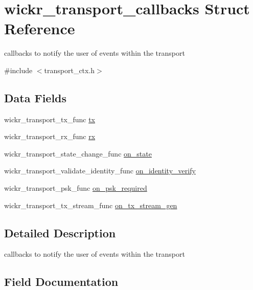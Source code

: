 \hypertarget{structwickr__transport__callbacks}{}\section{wickr\+\_\+transport\+\_\+callbacks Struct Reference}
\label{structwickr__transport__callbacks}


callbacks to notify the user of events within the transport  




{\ttfamily \#include $<$transport\+\_\+ctx.\+h$>$}

\subsection*{Data Fields}
\begin{DoxyCompactItemize}
\item 
wickr\+\_\+transport\+\_\+tx\+\_\+func \hyperlink{structwickr__transport__callbacks_a06c4b21b847c00e92373cf1402e1cb9d}{tx}
\item 
wickr\+\_\+transport\+\_\+rx\+\_\+func \hyperlink{structwickr__transport__callbacks_a5d523402980ac09fdf52aa4824f8e9f7}{rx}
\item 
wickr\+\_\+transport\+\_\+state\+\_\+change\+\_\+func \hyperlink{structwickr__transport__callbacks_afef0716506b88885c57fda652500b3da}{on\+\_\+state}
\item 
wickr\+\_\+transport\+\_\+validate\+\_\+identity\+\_\+func \hyperlink{structwickr__transport__callbacks_ab1afc16797b1bb30dde87936a97f682e}{on\+\_\+identity\+\_\+verify}
\item 
wickr\+\_\+transport\+\_\+psk\+\_\+func \hyperlink{structwickr__transport__callbacks_af01227bfe19f056de55669d79ed7c120}{on\+\_\+psk\+\_\+required}
\item 
wickr\+\_\+transport\+\_\+tx\+\_\+stream\+\_\+func \hyperlink{structwickr__transport__callbacks_a1b6ee026d404a5b267e0c680dc9c2337}{on\+\_\+tx\+\_\+stream\+\_\+gen}
\end{DoxyCompactItemize}


\subsection{Detailed Description}
callbacks to notify the user of events within the transport 

\subsection{Field Documentation}
\mbox{\label{structwickr__transport__callbacks_ab1afc16797b1bb30dde87936a97f682e}} 
